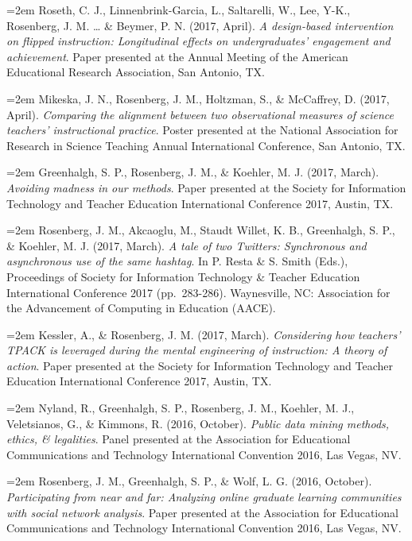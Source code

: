 \documentclass[
  14,
]{article}
\begin{document}
\hangindent=2em Roseth, C. J., Linnenbrink-Garcia, L., Saltarelli, W.,
Lee, Y-K., Rosenberg, J. M. \ldots{} \& Beymer, P. N. (2017, April).
\emph{A design-based intervention on flipped instruction: Longitudinal
effects on undergraduates' engagement and achievement}. Paper presented
at the Annual Meeting of the American Educational Research Association,
San Antonio, TX.

\hangindent=2em Mikeska, J. N., Rosenberg, J. M., Holtzman, S., \&
McCaffrey, D. (2017, April). \emph{Comparing the alignment between two
observational measures of science teachers' instructional practice}.
Poster presented at the National Association for Research in Science
Teaching Annual International Conference, San Antonio, TX.

\hangindent=2em Greenhalgh, S. P., Rosenberg, J. M., \& Koehler, M. J.
(2017, March). \emph{Avoiding madness in our methods}. Paper presented
at the Society for Information Technology and Teacher Education
International Conference 2017, Austin, TX.

\hangindent=2em Rosenberg, J. M., Akcaoglu, M., Staudt Willet, K. B.,
Greenhalgh, S. P., \& Koehler, M. J. (2017, March). \emph{A tale of two
Twitters: Synchronous and asynchronous use of the same hashtag}. In P.
Resta \& S. Smith (Eds.), Proceedings of Society for Information
Technology \& Teacher Education International Conference 2017
(pp.~283-286). Waynesville, NC: Association for the Advancement of
Computing in Education (AACE).

\hangindent=2em Kessler, A., \& Rosenberg, J. M. (2017, March).
\emph{Considering how teachers' TPACK is leveraged during the mental
engineering of instruction: A theory of action}. Paper presented at the
Society for Information Technology and Teacher Education International
Conference 2017, Austin, TX.

\hangindent=2em Nyland, R., Greenhalgh, S. P., Rosenberg, J. M.,
Koehler, M. J., Veletsianos, G., \& Kimmons, R. (2016, October).
\emph{Public data mining methods, ethics, \& legalities}. Panel
presented at the Association for Educational Communications and
Technology International Convention 2016, Las Vegas, NV.

\hangindent=2em Rosenberg, J. M., Greenhalgh, S. P., \& Wolf, L. G.
(2016, October). \emph{Participating from near and far: Analyzing online
graduate learning communities with social network analysis}. Paper
presented at the Association for Educational Communications and
Technology International Convention 2016, Las Vegas, NV.
\end{document}
